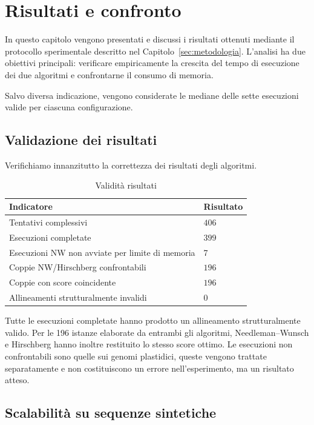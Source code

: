 \section{Risultati e confronto}

In questo capitolo vengono presentati e discussi i risultati ottenuti mediante il protocollo sperimentale descritto nel Capitolo~\ref{sec:metodologia}.
L'analisi ha due obiettivi principali: verificare empiricamente la crescita del tempo di esecuzione dei due algoritmi e confrontarne il 
consumo di memoria. 

Salvo diversa indicazione, vengono considerate le mediane delle sette esecuzioni valide per ciascuna configurazione.

\subsection{Validazione dei risultati}

Verifichiamo innanzitutto la correttezza dei risultati degli algoritmi.

\begin{table}[h]
    \centering
    \begin{tabular}{ll}
        \hline
        \textbf{Indicatore} & \textbf{Risultato} \\
        \hline
        Tentativi complessivi & $406$ \\
        Esecuzioni completate & $399$ \\
        Esecuzioni NW non avviate per limite di memoria & 7 \\
        Coppie NW/Hirschberg confrontabili & $196$ \\
        Coppie con score coincidente & $196$ \\
        Allineamenti strutturalmente invalidi & 0 \\
        \hline
    \end{tabular}
    \caption{Validità risultati}
    \label{tab:verifica_risultati}
\end{table}

Tutte le esecuzioni completate hanno prodotto un allineamento strutturalmente valido. Per le 196 istanze elaborate da entrambi gli algoritmi,
Needleman--Wunsch e Hirschberg hanno inoltre restituito lo stesso score ottimo.
Le esecuzioni non confrontabili sono quelle sui genomi plastidici, queste vengono trattate separatamente e non costituiscono un errore nell'esperimento,
ma un risultato atteso.

\subsection{Scalabilità su sequenze sintetiche}

